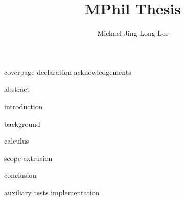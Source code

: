 \documentclass[12pt,a4paper,twoside,openany,BCOR=2cm]{scrbook}
\title{MPhil Thesis}
\author{Michael Jing Long Lee}
\begin{document}


\frontmatter
{
{coverpage}
{declaration}
{acknowledgements}

{abstract}

\hypersetup{linkcolor=black, linkbordercolor=white}
\tableofcontents

 }

\mainmatter
{introduction}

{background}

{calculus}

{scope-extrusion}


{conclusion}



\appendix

{auxiliary}
{tests}
{implementation}
\end{document}
